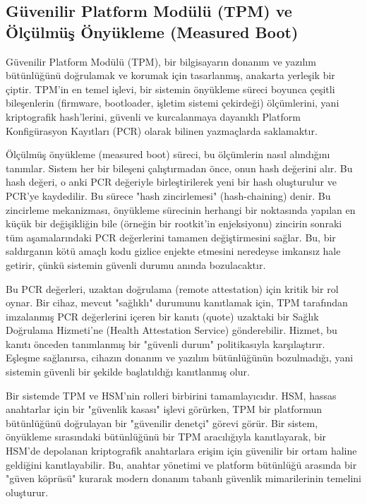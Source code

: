\subsection{Güvenilir Platform Modülü (TPM) ve Ölçülmüş Önyükleme (Measured Boot)}

Güvenilir Platform Modülü (TPM), bir bilgisayarın donanım ve yazılım bütünlüğünü doğrulamak ve korumak için tasarlanmış, anakarta yerleşik bir çiptir. TPM'in en temel işlevi, bir sistemin önyükleme süreci boyunca çeşitli bileşenlerin (firmware, bootloader, işletim sistemi çekirdeği) ölçümlerini, yani kriptografik hash'lerini, güvenli ve kurcalanmaya dayanıklı Platform Konfigürasyon Kayıtları (PCR) olarak bilinen yazmaçlarda saklamaktır.

Ölçülmüş önyükleme (measured boot) süreci, bu ölçümlerin nasıl alındığını tanımlar. Sistem her bir bileşeni çalıştırmadan önce, onun hash değerini alır. Bu hash değeri, o anki PCR değeriyle birleştirilerek yeni bir hash oluşturulur ve PCR'ye kaydedilir. Bu sürece "hash zincirlemesi" (hash-chaining) denir. Bu zincirleme mekanizması, önyükleme sürecinin herhangi bir noktasında yapılan en küçük bir değişikliğin bile (örneğin bir rootkit'in enjeksiyonu) zincirin sonraki tüm aşamalarındaki PCR değerlerini tamamen değiştirmesini sağlar. Bu, bir saldırganın kötü amaçlı kodu gizlice enjekte etmesini neredeyse imkansız hale getirir, çünkü sistemin güvenli durumu anında bozulacaktır.

Bu PCR değerleri, uzaktan doğrulama (remote attestation) için kritik bir rol oynar. Bir cihaz, mevcut "sağlıklı" durumunu kanıtlamak için, TPM tarafından imzalanmış PCR değerlerini içeren bir kanıtı (quote) uzaktaki bir Sağlık Doğrulama Hizmeti'ne (Health Attestation Service) gönderebilir. Hizmet, bu kanıtı önceden tanımlanmış bir "güvenli durum" politikasıyla karşılaştırır. Eşleşme sağlanırsa, cihazın donanım ve yazılım bütünlüğünün bozulmadığı, yani sistemin güvenli bir şekilde başlatıldığı kanıtlanmış olur.

Bir sistemde TPM ve HSM'nin rolleri birbirini tamamlayıcıdır. HSM, hassas anahtarlar için bir "güvenlik kasası" işlevi görürken, TPM bir platformun bütünlüğünü doğrulayan bir "güvenilir denetçi" görevi görür. Bir sistem, önyükleme sırasındaki bütünlüğünü bir TPM aracılığıyla kanıtlayarak, bir HSM'de depolanan kriptografik anahtarlara erişim için güvenilir bir ortam haline geldiğini kanıtlayabilir. Bu, anahtar yönetimi ve platform bütünlüğü arasında bir "güven köprüsü" kurarak modern donanım tabanlı güvenlik mimarilerinin temelini oluşturur.

